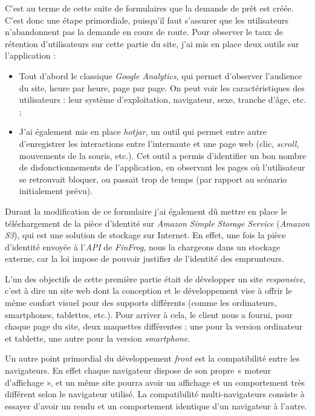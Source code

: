 \documentclass[12pt,a4paper]{article}
\providecommand{\tightlist}{%
  \setlength{\itemsep}{0pt}\setlength{\parskip}{0pt}}
\begin{document}
  \bigskip

  C'est au terme de cette suite de formulaires que la demande de prêt est
  créée. C'est donc une étape primordiale, puisqu'il faut s'assurer que
  les utilisateurs n'abandonnent pas la demande en cours de route. Pour
  observer le taux de rétention d'utilisateurs sur cette partie du site,
  j'ai mis en place deux outils sur l'application :

  \begin{itemize}
  \tightlist
  \item
    Tout d'abord le classique \emph{Google Analytics}, qui permet
    d'observer l'audience du site, heure par heure, page par page. On peut
    voir les caractéristiques des utilisateurs : leur système
    d'exploitation, navigateur, sexe, tranche d'âge, etc. ;
  \item
    J'ai également mis en place \emph{hotjar}, un outil qui permet entre
    autre d'enregistrer les interactions entre l'internaute et une page
    web (clic, \emph{scroll}, mouvements de la souris, etc.). Cet outil a
    permis d'identifier un bon nombre de disfonctionnements de
    l'application, en observant les pages où l'utilisateur se retrouvait
    bloquer, ou passait trop de temps (par rapport au scénario
    initialement prévu).
  \end{itemize}

  \bigskip

  Durant la modification de ce formulaire j'ai également dû mettre en
  place le téléchargement de la pièce d'identité sur \emph{Amazon Simple
  Storage Service} (\emph{Amazon S3}), qui est une solution de stockage
  sur Internet. En effet, une fois la pièce d'identité envoyée à
  l'\emph{API} de \emph{FinFrog}, nous la chargeons dans un stockage
  externe, car la loi impose de pouvoir justifier de l'identité des
  emprunteurs.

  \bigskip

  L'un des objectifs de cette première partie était de développer un site
  \emph{responsive}, c'est à dire un site web dont la conception et le
  développement vise à offrir le même confort visuel pour des supports
  différents (comme les ordinateurs, smartphones, tablettes, etc.). Pour
  arriver à cela, le client nous a fourni, pour chaque page du site, deux
  maquettes différentes : une pour la version ordinateur et tablette, une
  autre pour la version \emph{smartphone}.

  \bigskip

  Un autre point primordial du développement \emph{front} est la
  compatibilité entre les navigateurs. En effet chaque navigateur dispose
  de son propre « moteur d'affichage », et un même site pourra avoir un
  affichage et un comportement très différent selon le navigateur utilisé.
  La compatibilité multi-navigateurs consiste à essayer d'avoir un rendu
  et un comportement identique d'un navigateur à l'autre.
\end{document}
